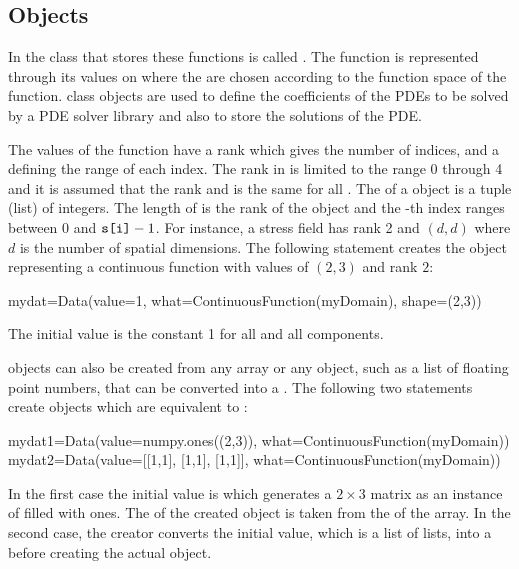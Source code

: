 \subsection{\Data Objects}
In \escript the class that stores these functions is called \Data.
The function is represented through its values on \DataSamplePoints where
the \DataSamplePoints are chosen according to the function space of the
function.
\Data class objects are used to define the coefficients of the PDEs to be
solved by a PDE solver library and also to store the solutions of the PDE.

The values of the function have a rank which gives the number of indices,
and a \Shape defining the range of each index.
The rank in \escript is limited to the range 0 through 4 and it is assumed
that the rank and \Shape is the same for all \DataSamplePoints.
The \Shape of a \Data object is a tuple (list)  of integers.
The length of  is the rank of the \Data object and the -th
index ranges between 0 and $\texttt{s[i]}-1$.
For instance, a stress field has rank 2 and \Shape $(d,d)$ where $d$ is the
number of spatial dimensions.
The following statement creates the \Data object  representing a
continuous function with values of \Shape $(2,3)$ and rank $2$:
\begin{python}
  mydat=Data(value=1, what=ContinuousFunction(myDomain), shape=(2,3))
\end{python}
The initial value is the constant 1 for all \DataSamplePoints and all
components.

\Data objects can also be created from any \numpy array or any object, such
as a list of floating point numbers, that can be converted into
a \numpyNDA\cite{NUMPY}.
The following two statements create objects which are equivalent
to :
\begin{python}
  mydat1=Data(value=numpy.ones((2,3)), what=ContinuousFunction(myDomain))
  mydat2=Data(value=[[1,1], [1,1], [1,1]], what=ContinuousFunction(myDomain))
\end{python}
In the first case the initial value is  which generates
a $2 \times 3$ matrix as an instance of \numpyNDA filled with ones.
The \Shape of the created \Data object is taken from the \Shape of the array.
In the second case, the creator converts the initial value, which is a list of
lists, into a \numpyNDA before creating the actual \Data object.

